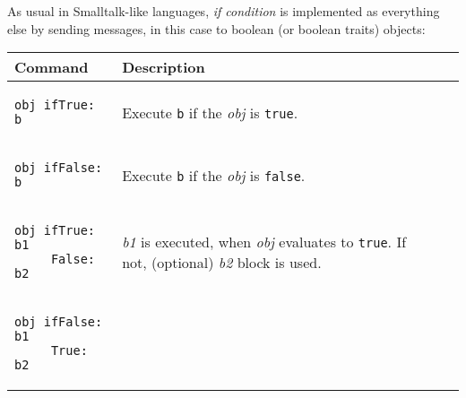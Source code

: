 \documentclass[10pt]{article}
\begin{document}
\begin{multicols*}{3}
As usual in Smalltalk-like languages, \textit{if condition} is implemented as everything else by sending messages, in this case to boolean (or boolean traits) objects:

\vspace*{0.2cm}

\small{
\begin{tabular}{ p{70pt} p{140pt} l l }
Command & Description \\ \hline

\begin{lstlisting}
obj ifTrue: b
\end{lstlisting}
&\vspace*{0.25cm}

Execute \texttt{b} if the \textit{obj} is \texttt{true}.

\\\hline %

\begin{lstlisting}
obj ifFalse: b
\end{lstlisting}
&\vspace*{0.25cm}

Execute \texttt{b} if the \textit{obj} is \texttt{false}.

\\\hline %

\begin{lstlisting}
obj ifTrue: b1
     False: b2
\end{lstlisting}
&\vspace*{0.1cm}

\textit{b1} is executed, when \textit{obj} evaluates to \texttt{true}.
If not, (optional) \textit{b2} block is used.

\\\hline %

\begin{lstlisting}
obj ifFalse: b1
     True: b2
\end{lstlisting}
&\vspace*{0.4cm}


\end{tabular}}
\end{multicols*}
\end{document}
